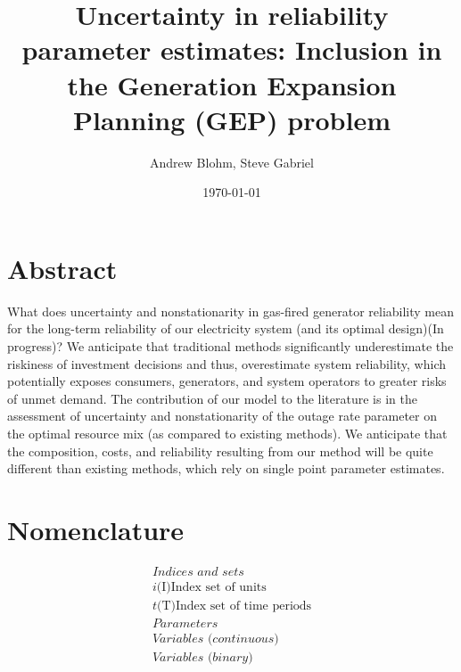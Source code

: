 \documentclass[10pt]{amsart}
\title{Uncertainty in reliability parameter estimates: Inclusion in the Generation Expansion Planning (GEP) problem}
\author{Andrew Blohm, Steve Gabriel}
\date{\today}
\begin{document}
\maketitle

\section{Abstract}
What does uncertainty and nonstationarity in gas-fired generator reliability mean for the long-term reliability of our electricity system (and its optimal design)(In progress)? 
We anticipate that traditional methods significantly underestimate the riskiness of investment decisions and thus, overestimate system reliability, which potentially exposes consumers, generators, and system operators to greater risks of unmet demand. 
The contribution of our model to the literature is in the assessment of uncertainty and nonstationarity of the outage rate parameter on the optimal resource mix (as compared to existing methods). 
We anticipate that the composition, costs, and reliability resulting from our method will be quite different than existing methods, which rely on single point parameter estimates. 

\section{Nomenclature}
\begin{equation*}
\begin{split}
\textit{Indices and sets} \\
\textit{i} \text{(I)} \text{Index set of units} \\
\textit{t} \text{(T)} \text{Index set of time periods} \\
\textit{Parameters} \\
\textit{Variables (continuous)} \\
\textit{Variables (binary)} \\
\end{split}
\end{equation*}
\end{document}
